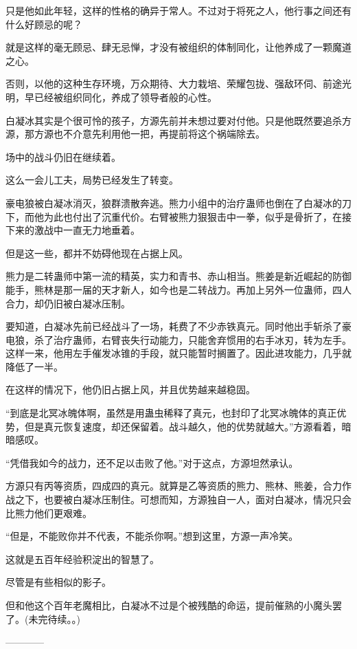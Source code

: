 \begin{this_body}
只是他如此年轻，这样的性格的确异于常人。不过对于将死之人，他行事之间还有什么好顾忌的呢？

就是这样的毫无顾忌、肆无忌惮，才没有被组织的体制同化，让他养成了一颗魔道之心。

否则，以他的这种生存环境，万众期待、大力栽培、荣耀包拢、强敌环伺、前途光明，早已经被组织同化，养成了领导者般的心性。

白凝冰其实是个很可怜的孩子，方源先前并未想过要对付他。只是他既然要追杀方源，那方源也不介意先利用他一把，再提前将这个祸端除去。

场中的战斗仍旧在继续着。

这么一会儿工夫，局势已经发生了转变。

豪电狼被白凝冰消灭，狼群溃散奔逃。熊力小组中的治疗蛊师也倒在了白凝冰的刀下，而他为此也付出了沉重代价。右臂被熊力狠狠击中一拳，似乎是骨折了，在接下来的激战中一直无力地垂着。

但是这一些，都并不妨碍他现在占据上风。

熊力是二转蛊师中第一流的精英，实力和青书、赤山相当。熊姜是新近崛起的防御能手，熊林是那一届的天才新人，如今也是二转战力。再加上另外一位蛊师，四人合力，却仍旧被白凝冰压制。

要知道，白凝冰先前已经战斗了一场，耗费了不少赤铁真元。同时他出手斩杀了豪电狼，杀了治疗蛊师，右臂丧失行动能力，只能舍弃惯用的右手冰刃，转为左手。这样一来，他用左手催发冰锥的手段，就只能暂时搁置了。因此进攻能力，几乎就降低了一半。

在这样的情况下，他仍旧占据上风，并且优势越来越稳固。

“到底是北冥冰魄体啊，虽然是用蛊虫稀释了真元，也封印了北冥冰魄体的真正优势，但是真元恢复速度，却还保留着。战斗越久，他的优势就越大。”方源看着，暗暗感叹。

“凭借我如今的战力，还不足以击败了他。”对于这点，方源坦然承认。

方源只有丙等资质，四成四的真元。就算是乙等资质的熊力、熊林、熊姜，合力作战之下，也要被白凝冰压制住。可想而知，方源独自一人，面对白凝冰，情况只会比熊力他们更艰难。

“但是，不能败你并不代表，不能杀你啊。”想到这里，方源一声冷笑。

这就是五百年经验积淀出的智慧了。

尽管是有些相似的影子。

但和他这个百年老魔相比，白凝冰不过是个被残酷的命运，提前催熟的小魔头罢了。(未完待续。。)

------------

\end{this_body}

